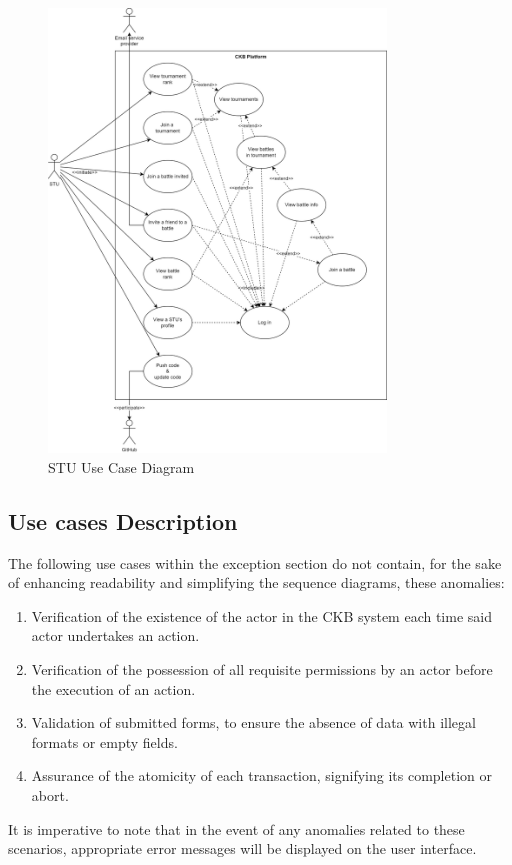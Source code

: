 \begin{figure}[H]
    \centering
    \includegraphics[width=0.8\textwidth]{images/sequence_diagrams/use_case_diagrams_STU.png}
    \caption{STU Use Case Diagram}
\end{figure}

\subsection{Use cases Description}
The following use cases within the exception section do not contain, for the sake of enhancing readability and simplifying the sequence diagrams, these anomalies:
\begin{enumerate}
    \item Verification of the existence of the actor in the CKB system each time said actor undertakes an action.
    \item Verification of the possession of all requisite permissions by an actor before the execution of an action.
    \item Validation of submitted forms, to ensure the absence of data with illegal formats or empty fields.
    \item Assurance of the atomicity of each transaction, signifying its completion or abort.
\end{enumerate}
It is imperative to note that in the event of any anomalies related to these scenarios, appropriate error messages will be displayed on the user interface.

